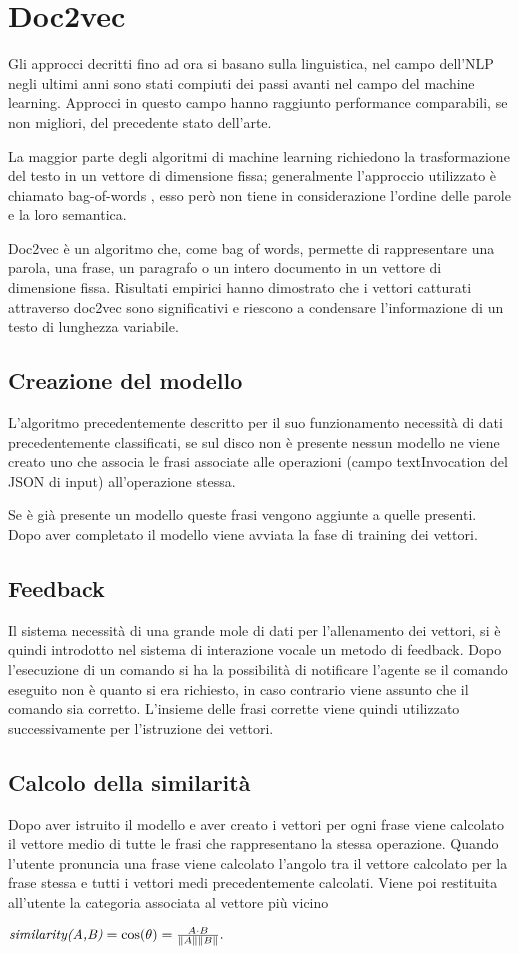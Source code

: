\documentclass[twoside]{supsistudent}
\begin{document}
\section{Doc2vec}
Gli approcci decritti fino ad ora si basano sulla linguistica, nel campo dell'NLP negli ultimi anni sono stati compiuti dei passi avanti nel campo del machine learning. Approcci in questo campo hanno raggiunto performance comparabili, se non migliori, del precedente stato dell'arte. 

La maggior parte degli algoritmi di machine learning richiedono la trasformazione del testo in un vettore di dimensione fissa; generalmente l'approccio utilizzato è chiamato bag-of-words , esso però non tiene in considerazione l'ordine delle parole e la loro semantica.\cite{bow}

Doc2vec è un algoritmo che, come bag of words, permette di  rappresentare una parola, una frase, un paragrafo o un intero documento in un vettore di dimensione fissa. Risultati empirici hanno dimostrato che i vettori catturati attraverso doc2vec sono significativi e riescono a condensare l'informazione di un testo di lunghezza variabile.\cite{doc2vec}
\subsection{Creazione del modello}
L'algoritmo precedentemente descritto per il suo funzionamento necessità di dati precedentemente classificati, se sul disco non è presente nessun modello ne viene creato uno che associa le frasi associate alle operazioni (campo textInvocation del JSON di input) all'operazione stessa. 

Se è già presente un modello queste frasi vengono aggiunte a quelle presenti. Dopo aver completato il modello viene avviata la fase di training dei vettori.
\subsection{Feedback}
Il sistema necessità di una grande mole di dati per l'allenamento dei vettori, si è quindi introdotto nel sistema di interazione vocale un metodo di feedback. Dopo l'esecuzione di un comando si ha la possibilità di notificare l'agente se il comando eseguito non è quanto si era richiesto, in caso contrario viene assunto che il comando sia corretto. L'insieme delle frasi corrette viene quindi utilizzato successivamente per l'istruzione dei vettori.
\subsection{Calcolo della similarità}
Dopo aver istruito il modello e aver creato i vettori per ogni frase viene calcolato il vettore medio di tutte le frasi che rappresentano la stessa operazione. Quando l'utente pronuncia una frase viene calcolato l'angolo tra il vettore calcolato per la frase stessa e tutti i vettori medi precedentemente calcolati. Viene poi restituita all'utente la categoria associata al vettore più vicino
\begin{center}
\begin{math}
 \textit{similarity(A,B)} = \cos(\theta) = {A \cdot B \over \|A\| \|B\|}.
 \end{math}
 \end{center}
\end{document}
